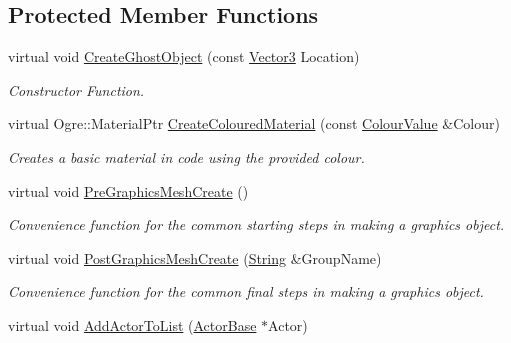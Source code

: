 \subsection*{Protected Member Functions}
\begin{DoxyCompactItemize}
\item 
virtual void \hyperlink{classphys_1_1AreaEffect_afe30d4ffa4e16dfb151446960dad61ac}{CreateGhostObject} (const \hyperlink{classphys_1_1Vector3}{Vector3} Location)
\begin{DoxyCompactList}\small\item\em Constructor Function. \item\end{DoxyCompactList}\item 
\hypertarget{classphys_1_1AreaEffect_aef2925aaa94dffb2b4d3755cfe41cb7d}{
virtual Ogre::MaterialPtr \hyperlink{classphys_1_1AreaEffect_aef2925aaa94dffb2b4d3755cfe41cb7d}{CreateColouredMaterial} (const \hyperlink{classphys_1_1ColourValue}{ColourValue} \&Colour)}
\label{d4/d55/classphys_1_1AreaEffect_aef2925aaa94dffb2b4d3755cfe41cb7d}

\begin{DoxyCompactList}\small\item\em Creates a basic material in code using the provided colour. \item\end{DoxyCompactList}\item 
\hypertarget{classphys_1_1AreaEffect_a923efe92684ce71e138ad182b356b9c0}{
virtual void \hyperlink{classphys_1_1AreaEffect_a923efe92684ce71e138ad182b356b9c0}{PreGraphicsMeshCreate} ()}
\label{d4/d55/classphys_1_1AreaEffect_a923efe92684ce71e138ad182b356b9c0}

\begin{DoxyCompactList}\small\item\em Convenience function for the common starting steps in making a graphics object. \item\end{DoxyCompactList}\item 
\hypertarget{classphys_1_1AreaEffect_a9f6a1379744fb3e323655f764e2dee1e}{
virtual void \hyperlink{classphys_1_1AreaEffect_a9f6a1379744fb3e323655f764e2dee1e}{PostGraphicsMeshCreate} (\hyperlink{namespacephys_aa03900411993de7fbfec4789bc1d392e}{String} \&GroupName)}
\label{d4/d55/classphys_1_1AreaEffect_a9f6a1379744fb3e323655f764e2dee1e}

\begin{DoxyCompactList}\small\item\em Convenience function for the common final steps in making a graphics object. \item\end{DoxyCompactList}\item 
\hypertarget{classphys_1_1AreaEffect_a7af039b84f8d55e2c1c2d5a1b57afd8a}{
virtual void \hyperlink{classphys_1_1AreaEffect_a7af039b84f8d55e2c1c2d5a1b57afd8a}{AddActorToList} (\hyperlink{classphys_1_1ActorBase}{ActorBase} $\ast$Actor)}
\label{d4/d55/classphys_1_1AreaEffect_a7af039b84f8d55e2c1c2d5a1b57afd8a}


\end{DoxyCompactItemize}
